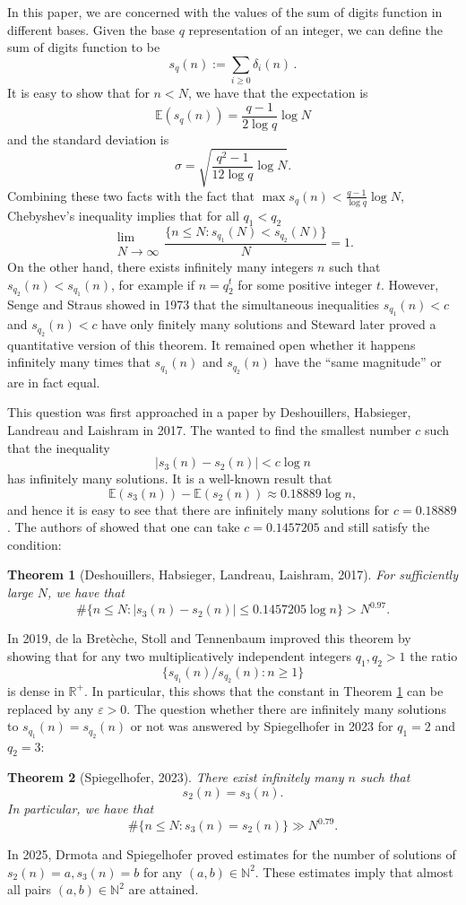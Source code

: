 \documentclass[12pt]{amsart}
\renewcommand{\leq}{\leqslant}
\renewcommand{\geq}{\geqslant}
\newtheorem{theorem}{Theorem}[section]
\theoremstyle{definition}
\numberwithin{equation}{section}
\newcommand\N{\mathbb{N}}
\newcommand\NN{\mathbb{N}}
\numberwithin{equation}{section}
\begin{document}
In this paper, we are concerned with the values of the sum of digits function in different bases. Given the base $q$ representation of an integer, we can define the sum of digits function to be
\begin{equation}
	s_q(n):= \sum_{i\geq 0}\delta_i(n)\,.
\end{equation}
It is easy to show that for $n<N$, we have that the expectation is 
\[
	\mathbb{E}(s_q(n))=\frac{q-1}{2\log q}\log N
\]
and the standard deviation is
\[
	\sigma = \sqrt{\frac{q^2-1}{12\log q}\log N}.
\]
Combining these two facts with the fact that $\max s_q(n)< \frac{q-1}{\log q}\log N$, Chebyshev's inequality implies that for all $q_1<q_2$
\[
	\substack{\lim\\N\rightarrow\infty}\frac{\{n\leq N:s_{q_1}(N)<s_{q_2}(N)\}}{N} = 1.
\] 
On the other hand, there exists infinitely many integers $n$ such that $s_{q_2}(n)<s_{q_1}(n)$, for example if $n=q_2^t$ for some positive integer $t$. However, Senge and Straus \cite{SengeStraus1973} showed in 1973 that the simultaneous inequalities $s_{q_1}(n)<c$ and $s_{q_2}(n)<c$ have only finitely many solutions and Steward \cite{Stewart1980} later proved a quantitative version of this theorem. It remained open whether it happens infinitely many times that $s_{q_1}(n)$ and $s_{q_2}(n)$ have the ``same magnitude'' or are in fact equal.

This question was first approached in a paper by Deshouillers, Habsieger, Landreau and Laishram \cite{DHLL2017} in 2017. The wanted to find the smallest number $c$ such that the inequality
\[
	|s_3(n)-s_2(n)|<c\log n
\]
has infinitely many solutions. It is a well-known result that 
\[
    \mathbb{E}(s_3(n))-\mathbb{E}(s_2(n))\approx0.18889\log n,
\]
and hence it is easy to see that there are infinitely many solutions for $c=0.18889$. The authors of \cite{DHLL2017} showed that one can take $c=0.1457205$ and still satisfy the condition: 
\begin{theorem}[Deshouillers, Habsieger, Landreau, Laishram, 2017] \label{DHLL17}
	For sufficiently large $N$, we have that
	\[
	\#\bigl\{n\leq N:\lvert s_3(n)-s_2(n)\rvert\leq 0.1457205\log n\bigr\}>N^{0.97}.
	\]
\end{theorem}
In 2019, de la Bretèche, Stoll and Tennenbaum \cite{BretecheStollTenenbaum2019} improved this theorem by showing that for any two multiplicatively independent integers $q_1,q_2>1$ the ratio
	\[
        \{s_{q_1}(n)/s_{q_2}(n):n\geq 1\}
	\]
is dense in $\mathbb{R}^+$. In particular, this shows that the constant in Theorem \ref{DHLL17} can be replaced by any $\varepsilon>0$. The question whether there are infinitely many solutions to $s_{q_1}(n)=s_{q_2}(n)$ or not was answered by Spiegelhofer \cite{Spiegelhofer2023a} in 2023 for $q_1=2$ and $q_2=3$:
\begin{theorem}[Spiegelhofer, 2023] \label{bases23}
	There exist infinitely many $n$ such that
	\[
		s_2(n)=s_3(n).
	\]
	In particular, we have that
	\[
	\#\bigl\{n\leq N: s_3(n)=s_2(n)\bigr\}\gg N^{0.79}.
	\]
\end{theorem}
In 2025, Drmota and Spiegelhofer \cite{DrmotaSpiegelhofer2025} proved estimates for the number of solutions of $s_2(n)=a,s_3(n)=b$ for any $(a,b)\in \NN^2$. These estimates imply that almost all pairs $(a,b)\in \NN^2$ are attained.
\end{document}
